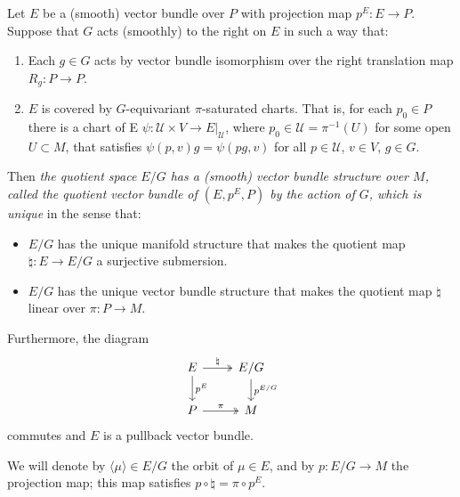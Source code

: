 \begin{proposition} \label{3.1.1}
Let $E$ be a (smooth) vector bundle over $P$ with projection map $p^E: E \to P$. Suppose that $G$ acts (smoothly) to the right on $E$ in such a way that:

\begin{enumerate}
    \item Each $g \in G$ acts by vector bundle isomorphism over the right translation map $R_g: P \to P$.
    
    \item $E$ is covered by $G$-equivariant $\pi$-saturated charts. That is, for each $p_0 \in P$ there is a chart of E $\psi: \mathcal U \times V \to E|_{\mathcal U}$, where $p_0 \in \mathcal U = \pi^{-1}(U)$ for some open $U \subset M$, that satisfies $\psi(p, v)g = \psi(pg, v)$ for all $p \in \mathcal U$, $v \in V$, $g \in G$.
\end{enumerate}

Then \emph{the quotient space $E/G$ has a (smooth) vector bundle structure over $M$, called \emph{the quotient vector bundle of $(E, p^E, P)$ by the action of $G$}, which is unique} in the sense that:
\begin{itemize}
    \item $E/G$ has the unique manifold structure that makes the quotient map $\natural: E \to E/G$ a surjective submersion.
    \item $E/G$ has the unique vector bundle structure that makes the quotient map $\natural$ linear over $\pi: P \to M$.
\end{itemize}

Furthermore, the diagram
\begin{equation} \label{pullbackQuotient}
\begin{tikzcd}
    E \arrow[two heads]{r}{\natural} \arrow{d}{p^E} & E/G \arrow{d}{p^{E/G}} \\
    P \arrow[two heads]{r}{\pi}                     & M
\end{tikzcd}
\end{equation}
commutes and $E$ is a pullback vector bundle.

We will denote by $\langle \mu \rangle \in E/G$ the orbit of $\mu \in E$, and by $p:E/G \to M$ the projection map; this map satisfies $p \circ \natural = \pi \circ p^E$.

\end{proposition}

